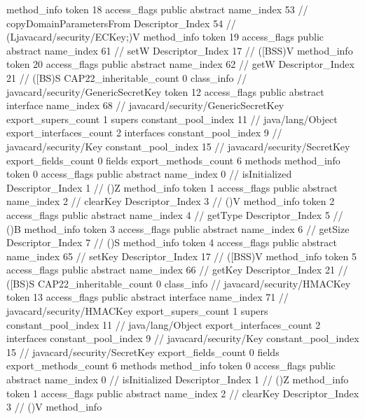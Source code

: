 {{{{				method_info {
					token	18
					access_flags	public abstract
					name_index	53		// copyDomainParametersFrom
					Descriptor_Index	54		// (Ljavacard/security/ECKey;)V
				}
				method_info {
					token	19
					access_flags	public abstract
					name_index	61		// setW
					Descriptor_Index	17		// ([BSS)V
				}
				method_info {
					token	20
					access_flags	public abstract
					name_index	62		// getW
					Descriptor_Index	21		// ([BS)S
				}
			}
			CAP22_inheritable_count	0
		}
		class_info {		// javacard/security/GenericSecretKey
			token	12
			access_flags	public abstract interface
			name_index	68		// javacard/security/GenericSecretKey
			export_supers_count	1
			supers {
				constant_pool_index	11		// java/lang/Object
			}
			export_interfaces_count	2
			interfaces {
				constant_pool_index	9		// javacard/security/Key
				constant_pool_index	15		// javacard/security/SecretKey
			}
			export_fields_count	0
			fields {
			}
			export_methods_count	6
			methods {
				method_info {
					token	0
					access_flags	public abstract
					name_index	0		// isInitialized
					Descriptor_Index	1		// ()Z
				}
				method_info {
					token	1
					access_flags	public abstract
					name_index	2		// clearKey
					Descriptor_Index	3		// ()V
				}
				method_info {
					token	2
					access_flags	public abstract
					name_index	4		// getType
					Descriptor_Index	5		// ()B
				}
				method_info {
					token	3
					access_flags	public abstract
					name_index	6		// getSize
					Descriptor_Index	7		// ()S
				}
				method_info {
					token	4
					access_flags	public abstract
					name_index	65		// setKey
					Descriptor_Index	17		// ([BSS)V
				}
				method_info {
					token	5
					access_flags	public abstract
					name_index	66		// getKey
					Descriptor_Index	21		// ([BS)S
				}
			}
			CAP22_inheritable_count	0
		}
		class_info {		// javacard/security/HMACKey
			token	13
			access_flags	public abstract interface
			name_index	71		// javacard/security/HMACKey
			export_supers_count	1
			supers {
				constant_pool_index	11		// java/lang/Object
			}
			export_interfaces_count	2
			interfaces {
				constant_pool_index	9		// javacard/security/Key
				constant_pool_index	15		// javacard/security/SecretKey
			}
			export_fields_count	0
			fields {
			}
			export_methods_count	6
			methods {
				method_info {
					token	0
					access_flags	public abstract
					name_index	0		// isInitialized
					Descriptor_Index	1		// ()Z
				}
				method_info {
					token	1
					access_flags	public abstract
					name_index	2		// clearKey
					Descriptor_Index	3		// ()V
				}
				method_info {
}}}}}
